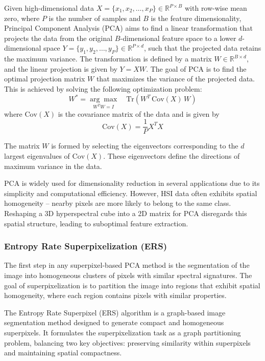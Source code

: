 \documentclass[twoside,english]{article}
\begin{document}
Given high-dimensional data \( X = \{x_1, x_2, \dots, x_P\} \in \mathbb{R}^{P \times B} \) with row-wise mean zero, where \( P \) is the number of samples and \( B \) is the feature dimensionality, Principal Component Analysis (PCA) aims to find a linear transformation that projects the data from the original \( B \)-dimensional feature space to a lower \( d \)-dimensional space \( Y = \{y_1, y_2, \dots, y_P\} \in \mathbb{R}^{P \times d} \), such that the projected data retains the maximum variance. The transformation is defined by a matrix \( W \in \mathbb{R}^{B \times d} \), and the linear projection is given by \( Y = XW\). The goal of PCA is to find the optimal projection matrix \( W \) that maximizes the variance of the projected data. This is achieved by solving the following optimization problem:
\begin{equation}
	W^* = \underset{W^T W = I}{\arg\max} \quad \text{Tr}(W^T \, \text{Cov}(X) \, W)
\end{equation}
where \(\text{Cov}(X)\) is the covariance matrix of the data and is given by 
\begin{equation}
	\text{Cov}(X) = \frac{1}{P} X^T X
\end{equation}


The matrix \( W \) is formed by selecting the eigenvectors corresponding to the \( d \) largest eigenvalues of \( \text{Cov}(X) \). These eigenvectors define the directions of maximum variance in the data.

PCA is widely used for dimensionality reduction in several applications due to its simplicity and computational efficiency. However, HSI data often exhibits spatial homogeneity -- nearby pixels are more likely to belong to the same class. Reshaping a 3D hyperspectral cube into a 2D matrix for PCA disregards this spatial structure, leading to suboptimal feature extraction.

\subsubsection{Entropy Rate Superpixelization (ERS)}\label{sec:ers}
The first step in any superpixel-based PCA method is the segmentation of the image into homogeneous clusters of pixels with similar spectral signatures. The goal of superpixelization is to partition the image into regions that exhibit spatial homogeneity, where each region contains pixels with similar properties. 

The Entropy Rate Superpixel (ERS) algorithm is a graph-based image segmentation method designed to generate compact and homogeneous superpixels. It formulates the superpixelization task as a graph partitioning problem, balancing two key objectives: preserving similarity within superpixels and maintaining spatial compactness.
\end{document}

